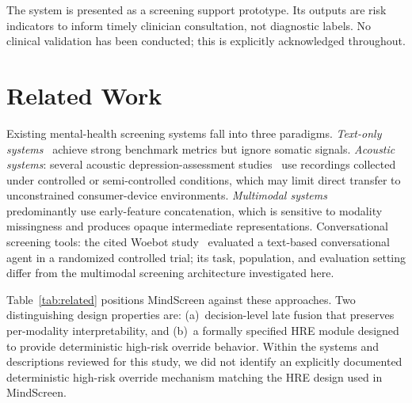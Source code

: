\documentclass[10pt, conference, letterpaper]{IEEEtran}
\begin{document}
The system is presented as a screening support prototype.
Its outputs are risk indicators to inform timely clinician consultation, not
diagnostic labels.
No clinical validation has been conducted; this is explicitly acknowledged
throughout.

\section{Related Work}
\label{sec:related}

Existing mental-health screening systems fall into three paradigms.
\textit{Text-only systems}~\cite{ji2022,xu2024} achieve strong benchmark
metrics but ignore somatic signals.
\textit{Acoustic systems}: several acoustic depression-assessment
studies~\cite{cummins2015,scherer2013} use recordings collected under controlled
or semi-controlled conditions, which may limit direct transfer to unconstrained
consumer-device environments.
\textit{Multimodal systems}~\cite{yang2023,ringeval2019,devault2014} predominantly
use early-feature concatenation, which is sensitive to modality missingness and
produces opaque intermediate representations.
Conversational screening tools: the cited Woebot study~\cite{fitzpatrick2017}
evaluated a text-based conversational agent in a randomized controlled trial;
its task, population, and evaluation setting differ from the multimodal
screening architecture investigated here.

Table~\ref{tab:related} positions MindScreen against these approaches.
Two distinguishing design properties are: (a)~decision-level late fusion that
preserves per-modality interpretability, and (b)~a formally specified HRE
module designed to provide deterministic high-risk override behavior.
Within the systems and descriptions reviewed for this study, we did not identify
an explicitly documented deterministic high-risk override mechanism matching the
HRE design used in MindScreen.
\end{document}

